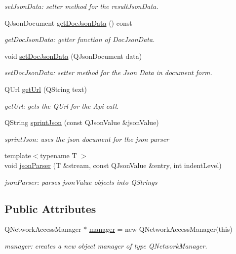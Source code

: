 \begin{DoxyCompactItemize}
\begin{DoxyCompactList}\small\item\em set\+Json\+Data\+: setter method for the result\+Json\+Data. \end{DoxyCompactList}\item 
Q\+Json\+Document \hyperlink{classstd_1_1searchBox_ac370a8ef8abb0d3f2fb5330ef23b26ab}{get\+Doc\+Json\+Data} () const
\begin{DoxyCompactList}\small\item\em get\+Doc\+Json\+Data\+: getter function of Doc\+Json\+Data. \end{DoxyCompactList}\item 
void \hyperlink{classstd_1_1searchBox_ae18823c4866780b727a9fbd626e9ec09}{set\+Doc\+Json\+Data} (Q\+Json\+Document data)
\begin{DoxyCompactList}\small\item\em set\+Doc\+Json\+Data\+: setter method for the Json Data in document form. \end{DoxyCompactList}\item 
Q\+Url \hyperlink{classstd_1_1searchBox_add3510cfd6c74e6978f413c271de176f}{get\+Url} (Q\+String text)
\begin{DoxyCompactList}\small\item\em get\+Url\+: gets the Q\+Url for the Api call. \end{DoxyCompactList}\item 
Q\+String \hyperlink{classstd_1_1searchBox_a4062270742fd88230f11182f34a854a2}{sprint\+Json} (const Q\+Json\+Value \&json\+Value)
\begin{DoxyCompactList}\small\item\em sprint\+Json\+: uses the json document for the json parser \end{DoxyCompactList}\item 
{\footnotesize template$<$typename T $>$ }\\void \hyperlink{classstd_1_1searchBox_abaa8a631bd23679e319a7290c703edac}{json\+Parser} (T \&stream, const Q\+Json\+Value \&entry, int indent\+Level)
\begin{DoxyCompactList}\small\item\em json\+Parser\+: parses json\+Value objects into Q\+Strings \end{DoxyCompactList}\end{DoxyCompactItemize}
\subsection*{Public Attributes}
\begin{DoxyCompactItemize}
\item 
Q\+Network\+Access\+Manager $\ast$ \hyperlink{classstd_1_1searchBox_afd76f8227036d0d42122cd152bca52f2}{manager} = new Q\+Network\+Access\+Manager(this)
\begin{DoxyCompactList}\small\item\em manager\+: creates a new object manager of type Q\+Network\+Manager. \end{DoxyCompactList}\end{DoxyCompactItemize}
